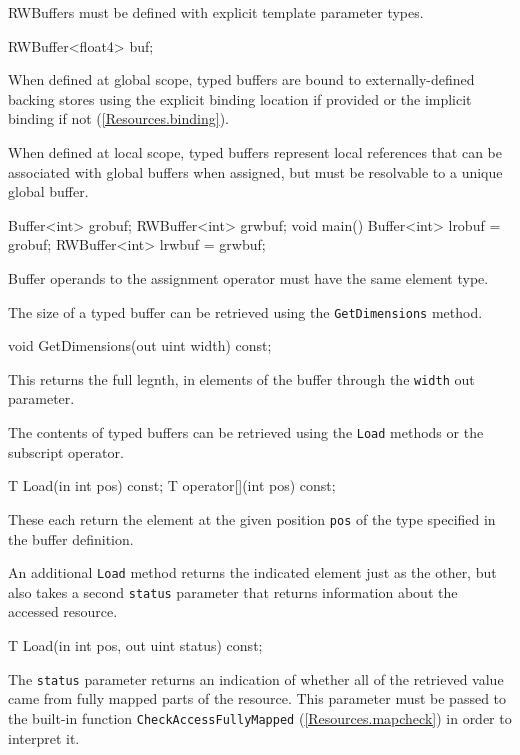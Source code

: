 RWBuffers must be defined with explicit template parameter types.
\begin{HLSL}
  RWBuffer<float4> buf;
\end{HLSL}

When defined at global scope, typed buffers are bound to externally-defined backing stores
using the explicit binding location if provided or the implicit binding if not (\ref{Resources.binding}).

When defined at local scope, typed buffers represent local references
that can be associated with global buffers when assigned,
but must be resolvable to a unique global buffer.

\begin{HLSL}
  Buffer<int> grobuf;
  RWBuffer<int> grwbuf;
  void main() {
    Buffer<int> lrobuf = grobuf;
    RWBuffer<int> lrwbuf = grwbuf;
  }
\end{HLSL}
Buffer operands to the assignment operator must have the same element type.


The size of a typed buffer can be retrieved using the \texttt{GetDimensions} method.
\begin{HLSL}
void GetDimensions(out uint width) const;
\end{HLSL}

This returns the full legnth, in elements of the buffer through the \texttt{width} out parameter.


The contents of typed buffers can be retrieved using the \texttt{Load} methods
or the subscript operator.

\begin{HLSL}
 T Load(in int pos) const;
 T operator[](int pos) const;
\end{HLSL}

These each return the element at the given position \texttt{pos} of the type specified in the buffer definition.

An additional \texttt{Load} method returns the indicated element just as the other,
but also takes a second \texttt{status} parameter that returns information about the accessed resource.
\begin{HLSL}
 T Load(in int pos, out uint status) const;
\end{HLSL}

The \texttt{status} parameter returns an indication of whether all of the retrieved value
came from fully mapped parts of the resource.
This parameter must be passed to the built-in function \texttt{CheckAccessFullyMapped} (\ref{Resources.mapcheck})
in order to interpret it.

